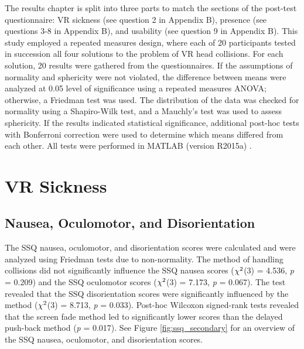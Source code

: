 The results chapter is split into three parts to match the sections of the post-test questionnaire: VR sickness (see question 2 in Appendix B), presence (see questions 3-8 in Appendix B), and usability (see question 9 in Appendix B). This study employed a repeated measures design, where each of 20 participants tested in succession all four solutions to the problem of VR head collisions. For each solution, 20 results were gathered from the questionnaires. If the assumptions of normality and sphericity were not violated, the difference between means were analyzed at 0.05 level of significance using a repeated measures ANOVA; otherwise, a Friedman test was used. The distribution of the data was checked for normality using a Shapiro-Wilk test, and a Mauchly's test was used to assess sphericity. If the results indicated statistical significance, additional post-hoc tests with Bonferroni correction were used to determine which means differed from each other. All tests were performed in MATLAB (version R2015a) \cite{MATLAB}.

\section{VR Sickness}

\subsection{Nausea, Oculomotor, and Disorientation}

The SSQ nausea, oculomotor, and disorientation scores were calculated and were analyzed using Friedman tests due to non-normality. The method of handling collisions did not significantly influence the SSQ nausea scores (\textit{$\chi\textsuperscript{2}$}(3) = 4.536, \textit{p} = 0.209) and the SSQ oculomotor scores (\textit{$\chi\textsuperscript{2}$}(3) = 7.173, \textit{p} = 0.067). The test revealed that the SSQ disorientation scores were significantly influenced by the method (\textit{$\chi\textsuperscript{2}$}(3) = 8.713, \textit{p} = 0.033). Post-hoc Wilcoxon signed-rank tests revealed that the screen fade method led to significantly lower scores than the delayed push-back method (\textit{p} = 0.017). See Figure \ref{fig:ssq_secondary} for an overview of the SSQ nausea, oculomotor, and disorientation scores.

